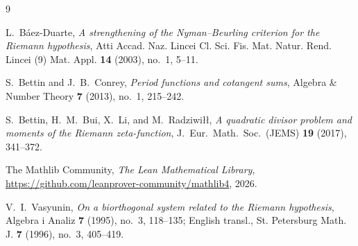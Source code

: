 \documentclass[11pt,a4paper]{article}
\theoremstyle{definition}
\begin{document}
\begin{thebibliography}{9}
\raggedright

L.~B\'aez-Duarte, \emph{A strengthening of the Nyman--Beurling criterion for the Riemann hypothesis}, Atti Accad. Naz. Lincei Cl. Sci. Fis. Mat. Natur. Rend. Lincei (9) Mat. Appl. \textbf{14} (2003), no.~1, 5--11.

S.~Bettin and J.~B.~Conrey, \emph{Period functions and cotangent sums}, Algebra \& Number Theory \textbf{7} (2013), no.~1, 215--242.

S.~Bettin, H.~M.~Bui, X.~Li, and M.~Radziwi{\l}{\l}, \emph{A quadratic divisor problem and moments of the Riemann zeta-function}, J.~Eur.\ Math.\ Soc.\ (JEMS) \textbf{19} (2017), 341--372.

The Mathlib Community, \emph{The Lean Mathematical Library}, \url{https://github.com/leanprover-community/mathlib4}, 2026.

V.~I.~Vasyunin, \emph{On a biorthogonal system related to the Riemann hypothesis}, Algebra i Analiz \textbf{7} (1995), no.~3, 118--135; English transl., St. Petersburg Math. J. \textbf{7} (1996), no.~3, 405--419.

\end{thebibliography}
\end{document}
